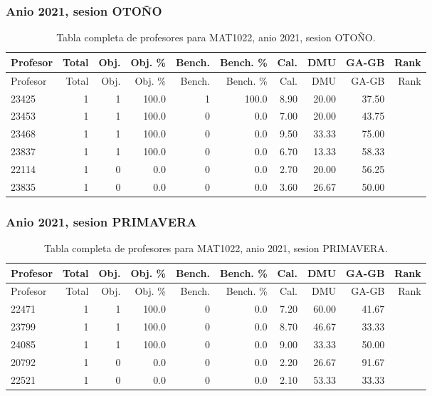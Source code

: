 \subsubsection{Anio 2021, sesion OTOÑO}

\begingroup
\scriptsize
\setlength{\tabcolsep}{3pt}
\begin{longtable}{lrrrrrrrrr}
\caption{Tabla completa de profesores para MAT1022, anio 2021, sesion OTOÑO.}\label{tab:prof-period-mat1022-2021-oto-o}\\
\toprule
Profesor & Total & Obj. & Obj. \% & Bench. & Bench. \% & Cal. & DMU & GA-GB & Rank \\
\midrule
\endfirsthead
\toprule
Profesor & Total & Obj. & Obj. \% & Bench. & Bench. \% & Cal. & DMU & GA-GB & Rank \\
\midrule
\endhead
23425 & 1 & 1 & 100.0 & 1 & 100.0 & 8.90 & 20.00 & 37.50 &  \\
23453 & 1 & 1 & 100.0 & 0 & 0.0 & 7.00 & 20.00 & 43.75 &  \\
23468 & 1 & 1 & 100.0 & 0 & 0.0 & 9.50 & 33.33 & 75.00 &  \\
23837 & 1 & 1 & 100.0 & 0 & 0.0 & 6.70 & 13.33 & 58.33 &  \\
22114 & 1 & 0 & 0.0 & 0 & 0.0 & 2.70 & 20.00 & 56.25 &  \\
23835 & 1 & 0 & 0.0 & 0 & 0.0 & 3.60 & 26.67 & 50.00 &  \\
\bottomrule
\end{longtable}
\endgroup

\subsubsection{Anio 2021, sesion PRIMAVERA}

\begingroup
\scriptsize
\setlength{\tabcolsep}{3pt}
\begin{longtable}{lrrrrrrrrr}
\caption{Tabla completa de profesores para MAT1022, anio 2021, sesion PRIMAVERA.}\label{tab:prof-period-mat1022-2021-primavera}\\
\toprule
Profesor & Total & Obj. & Obj. \% & Bench. & Bench. \% & Cal. & DMU & GA-GB & Rank \\
\midrule
\endfirsthead
\toprule
Profesor & Total & Obj. & Obj. \% & Bench. & Bench. \% & Cal. & DMU & GA-GB & Rank \\
\midrule
\endhead
22471 & 1 & 1 & 100.0 & 0 & 0.0 & 7.20 & 60.00 & 41.67 &  \\
23799 & 1 & 1 & 100.0 & 0 & 0.0 & 8.70 & 46.67 & 33.33 &  \\
24085 & 1 & 1 & 100.0 & 0 & 0.0 & 9.00 & 33.33 & 50.00 &  \\
20792 & 1 & 0 & 0.0 & 0 & 0.0 & 2.20 & 26.67 & 91.67 &  \\
22521 & 1 & 0 & 0.0 & 0 & 0.0 & 2.10 & 53.33 & 33.33 &  \\
\bottomrule
\end{longtable}
\endgroup

